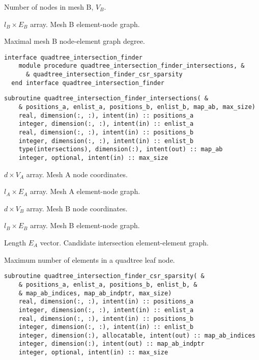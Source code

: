 \documentclass{article}
\begin{document}
\begin{description}[font=\ttfamily\bfseries,leftmargin=2.2\parindent,labelindent=1.7\parindent,noitemsep]
  \item[nnodes] Number of nodes in mesh B, $V_B$.
  \item[enlist] $l_B \times E_B$ array. Mesh B element-node graph.
  \item[max\_degree] Maximal mesh B node-element graph degree.
\end{description}

\begin{lstlisting}[language=FORTRAN]  
  interface quadtree_intersection_finder
    module procedure quadtree_intersection_finder_intersections, &
      & quadtree_intersection_finder_csr_sparsity
  end interface quadtree_intersection_finder
\end{lstlisting}

\begin{lstlisting}[language=FORTRAN]
  subroutine quadtree_intersection_finder_intersections( &
    & positions_a, enlist_a, positions_b, enlist_b, map_ab, max_size)
    real, dimension(:, :), intent(in) :: positions_a
    integer, dimension(:, :), intent(in) :: enlist_a
    real, dimension(:, :), intent(in) :: positions_b
    integer, dimension(:, :), intent(in) :: enlist_b
    type(intersections), dimension(:), intent(out) :: map_ab
    integer, optional, intent(in) :: max_size
\end{lstlisting}

\begin{description}[font=\ttfamily\bfseries,leftmargin=2.2\parindent,labelindent=1.7\parindent,noitemsep]
  \item[positions\_a] $d \times V_A$ array. Mesh A node coordinates.
  \item[enlist\_a] $l_A \times E_A$ array. Mesh A element-node graph.
  \item[positions\_b] $d \times V_B$ array. Mesh B node coordinates.
  \item[enlist\_b] $l_B \times E_B$ array. Mesh B element-node graph.
  \item[map\_ab] Length $E_A$ vector. Candidate intersection element-element
    graph.
  \item[max\_size] Maximum number of elements in a quadtree leaf node.
\end{description}
  
\begin{lstlisting}[language=FORTRAN]
  subroutine quadtree_intersection_finder_csr_sparsity( &
    & positions_a, enlist_a, positions_b, enlist_b, &
    & map_ab_indices, map_ab_indptr, max_size)
    real, dimension(:, :), intent(in) :: positions_a
    integer, dimension(:, :), intent(in) :: enlist_a
    real, dimension(:, :), intent(in) :: positions_b
    integer, dimension(:, :), intent(in) :: enlist_b
    integer, dimension(:), allocatable, intent(out) :: map_ab_indices
    integer, dimension(:), intent(out) :: map_ab_indptr
    integer, optional, intent(in) :: max_size
\end{lstlisting}
\end{document}
